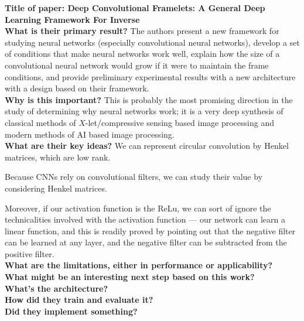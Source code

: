 
\noindent \textbf{\large Title of paper: Deep Convolutional Framelets: A General Deep Learning Framework For Inverse}
\\

\noindent\textbf{\large What is their primary result?} The authors present a new
framework for studying neural networks (especially convolutional neural
networks), develop a set of conditions that make neural networks work well,
explain how the size of a convolutional neural network would grow if it were to
maintain the frame conditions, and provide preliminary experimental results with
a new architecture with a design based on their framework. 
\\

\noindent\textbf{\large Why is this important?} This is probably the most
promising direction in the study of determining why neural networks work; it is
a very deep synthesis of classical methods of $X$-let/compressive sensing based
image processing and modern methods of AI based image processing.
\\

\noindent\textbf{\large What are their key ideas?}
We can represent circular convolution by Henkel matrices, which are low rank.

Because CNNs rely on convolutional filters, we can study their value by
considering Henkel matrices.

Moreover, if our activation function is the ReLu, we can sort of ignore the
technicalities involved with the activation function --- our network can learn a
linear function, and this is readily proved by pointing out that the negative
filter can be learned at any layer, and the negative filter can be subtracted
from the positive filter. 
\\

\noindent\textbf{\large What are the limitations, either in performance or applicability?}
\\

\noindent\textbf{\large What might be an interesting next step based on this work?}
\\

\noindent\textbf{\large What's the architecture?}
\\

\noindent\textbf{\large How did they train and evaluate it?}
\\

\noindent\textbf{\large Did they implement something?}
\\

